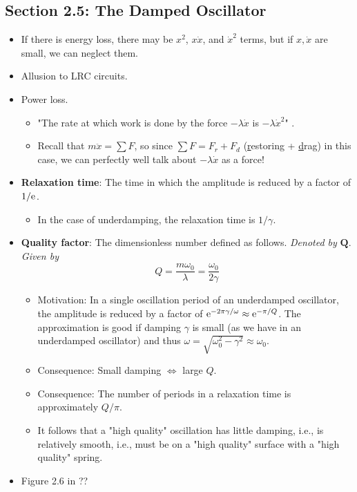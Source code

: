 \documentclass[../notes.tex]{subfiles}
\begin{document}
\subsection*{Section 2.5: The Damped Oscillator}
\begin{itemize}
    \item If there is energy loss, there may be $x^2$, $x\dot{x}$, and $\dot{x}^2$ terms, but if $x,\dot{x}$ are small, we can neglect them.
    \item Allusion to LRC circuits.
    \item Power loss.
    \begin{itemize}
        \item "The rate at which work is done by the force $-\lambda\dot{x}$ is $-\lambda\dot{x}^2$" \parencite[27]{bib:KibbleBerkshire}.
        \item Recall that $m\ddot{x}=\sum F$, so since $\sum F=F_r+F_d$ (\underline{r}estoring + \underline{d}rag) in this case, we can perfectly well talk about $-\lambda\dot{x}$ as a force!
    \end{itemize}
    \item \textbf{Relaxation time}: The time in which the amplitude is reduced by a factor of $1/\e$.
    \begin{itemize}
        \item In the case of underdamping, the relaxation time is $1/\gamma$.
    \end{itemize}
    \item \textbf{Quality factor}: The dimensionless number defined as follows. \emph{Denoted by} $\bm{Q}$. \emph{Given by}
    \begin{equation*}
        Q = \frac{m\omega_0}{\lambda}
        = \frac{\omega_0}{2\gamma}
    \end{equation*}
    \begin{itemize}
        \item Motivation: In a single oscillation period of an underdamped oscillator, the amplitude is reduced by a factor of $\e[-2\pi\gamma/\omega]\approx\e[-\pi/Q]$. The approximation is good if damping $\gamma$ is small (as we have in an underdamped oscillator) and thus $\omega=\sqrt{\omega_0^2-\gamma^2}\approx\omega_0$.
        \item Consequence: Small damping $\Longleftrightarrow$ large $Q$.
        \item Consequence: The number of periods in a relaxation time is approximately $Q/\pi$.
        \item It follows that a "high quality" oscillation has little damping, i.e., is relatively smooth, i.e., must be on a "high quality" surface with a "high quality" spring.
    \end{itemize}
    \item Figure 2.6 in \textcite{bib:KibbleBerkshire}??
\end{itemize}
\end{document}
